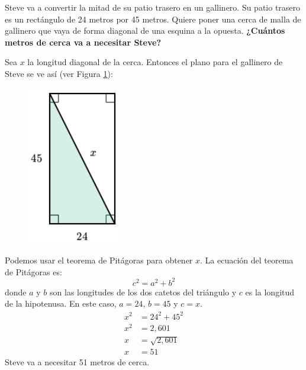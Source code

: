 Steve va a convertir la mitad de su patio trasero en un gallinero. Su patio trasero es un rectángulo de 24 metros por 45 metros. Quiere poner una cerca de malla de gallinero que vaya de forma diagonal de una esquina a la opuesta.
\textbf{¿Cuántos metros de cerca va a necesitar Steve?}\\

\begin{solutionbox}{15cm}
    Sea $x$ la longitud diagonal de la cerca. Entonces el plano para el gallinero de Steve se ve así (ver Figura \ref{fig:proverb_pitagoras_09}):
    \begin{figure}[H]
        \centering
        \includegraphics[width=0.2\linewidth]{../images/proverb_pitagoras_09.png}
        \caption{}
        \label{fig:proverb_pitagoras_09}
    \end{figure}
    Podemos usar el teorema de Pitágoras para obtener $x$.
    La ecuación del teorema de Pitágoras es:
    \[c^2=a^2+b^2\]
    donde $a$ y $b$ son las longitudes de los dos catetos del triángulo y $c$ es la longitud de la hipotenusa.
    En este caso, $a=24$, $b=45$ y $c=x$.
    \begin{align*}
        x^2 & =24^2+45^2    \\
        x^2 & =2,601        \\
        x   & =\sqrt{2,601} \\
        x   & =51
    \end{align*}
    Steve va a necesitar 51 metros de cerca.
\end{solutionbox}